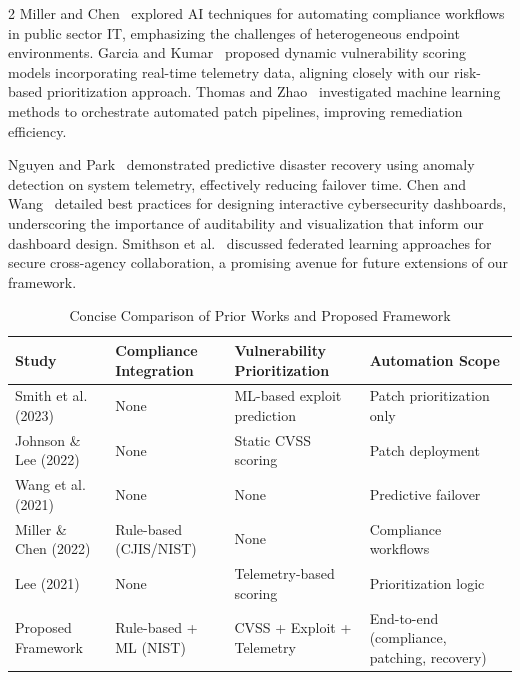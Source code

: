 \documentclass[10pt]{article} %
\begin{document}
\begin{multicols}{2}
Miller and Chen~\cite{miller2022ai} explored AI techniques for automating compliance workflows in public sector IT, emphasizing the challenges of heterogeneous endpoint environments. Garcia and Kumar~\cite{garcia2020vulnerability} proposed dynamic vulnerability scoring models incorporating real-time telemetry data, aligning closely with our risk-based prioritization approach. Thomas and Zhao~\cite{thomas2021automated} investigated machine learning methods to orchestrate automated patch pipelines, improving remediation efficiency.

Nguyen and Park~\cite{nguyen2022disaster} demonstrated predictive disaster recovery using anomaly detection on system telemetry, effectively reducing failover time. Chen and Wang~\cite{chen2019dashboard} detailed best practices for designing interactive cybersecurity dashboards, underscoring the importance of auditability and visualization that inform our dashboard design. Smithson et al.~\cite{smithson2021federated} discussed federated learning approaches for secure cross-agency collaboration, a promising avenue for future extensions of our framework.


\begin{table}[H]
\centering
\caption{Concise Comparison of Prior Works and Proposed Framework}
\label{tab:comparison}
\renewcommand{\arraystretch}{2}
\tiny
\begin{tabular}{|p{1.8cm}|p{1cm}|p{1.2cm}|p{2cm}|}
\hline
\textbf{Study} & \textbf{Compliance Integration} & \textbf{Vulnerability Prioritization} & \textbf{Automation Scope} \\
\hline
Smith et al. (2023) & None & ML-based exploit prediction & Patch prioritization only \\
\hline
Johnson \& Lee (2022) & None & Static CVSS scoring & Patch deployment \\
\hline
Wang et al. (2021) & None & None & Predictive failover \\
\hline
Miller \& Chen (2022) & Rule-based (CJIS/NIST) & None & Compliance workflows \\
\hline
Lee (2021) & None & Telemetry-based scoring & Prioritization logic \\
\hline
Proposed Framework & Rule-based + ML (NIST) & CVSS + Exploit + Telemetry & End-to-end (compliance, patching, recovery) \\
\hline
\end{tabular}
\end{table}


\end{multicols}
\end{document}
